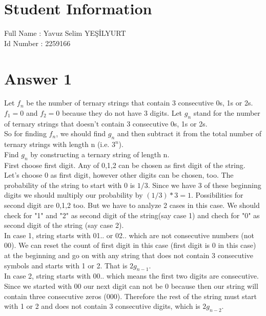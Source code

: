 \documentclass[12pt]{article}
\begin{document}
	
\section*{Student Information } 
Full Name : Yavuz Selim YEŞİLYURT \\
Id Number : 2259166 \\

\section*{Answer 1}
\qquad Let $f_n$ be the number of ternary strings that contain 3 consecutive 0s, 1s or 2s. $f_1=0$ and $f_2 =0$ because they do not have 3 digits. Let $g_n$ stand for the number of ternary strings that doesn't contain 3 consecutive 0s, 1s or 2s.\\

So for finding $f_n$, we should find $g_n$ and then subtract it from the total number of ternary strings with length n (i.e. $3^n$).\\

Find $g_n$ by constructing a ternary string of length n.\\

First choose first digit. Any of 0,1,2 can be chosen as first digit of the string. Let's choose 0 as first digit, however other digits can be chosen, too. The probability of the string to start with 0 is $1/3$. Since we have 3 of these beginning digits we should multiply our probability by $(1/3) * 3 = 1$. Possibilities for second digit are 0,1,2 too. But we have to analyze 2 cases in this case. We should check for "1" and "2" as second digit of the string(say case 1) and chech for "0" as second digit of the string (say case 2). \\

In case 1, string starts with 01.. or 02.. which are not consecutive numbers (not 00). We can reset the count of first digit in this case (first digit is 0 in this case) at the beginning and go on with any string that does not contain 3 consecutive symbols and starts with 1 or 2. That is $2g_{n-1}$.\\

In case 2, string starts with 00.. which means the first two digits are consecutive. Since we started with 00 our next digit can not be 0 because then our string will contain three consecutive zeros (000). Therefore the rest of the string must start with 1 or 2 and does not contain 3 consecutive digits, which is $2g_{n-2}$.\\
\end{document}
